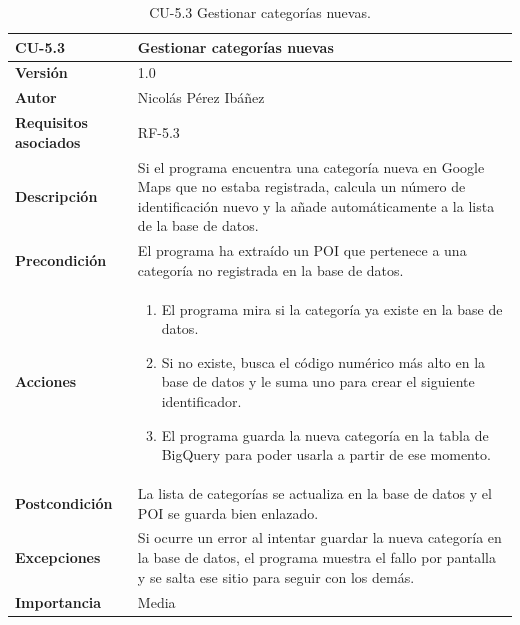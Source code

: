\begin{table}[p]
	\centering
	\begin{tabularx}{\linewidth}{ p{} p{} }
		\toprule
		\textbf{CU-5.3}  & \textbf{Gestionar categorías nuevas}\\
		\toprule
		\textbf{Versión}              & 1.0    \\
		\textbf{Autor}                & Nicolás Pérez Ibáñez \\
		\textbf{Requisitos asociados} & RF-5.3 \\
		\textbf{Descripción}          & Si el programa encuentra una categoría nueva en Google Maps que no estaba registrada, calcula un número de identificación nuevo y la añade automáticamente a la lista de la base de datos. \\
		\textbf{Precondición}         & El programa ha extraído un POI que pertenece a una categoría no registrada en la base de datos. \\
		\textbf{Acciones}             &
		\begin{enumerate}
			\def\labelenumi{\arabic{enumi}.}
			\tightlist
			\item El programa mira si la categoría ya existe en la base de datos.
			\item Si no existe, busca el código numérico más alto en la base de datos y le suma uno para crear el siguiente identificador.
			\item El programa guarda la nueva categoría en la tabla de BigQuery para poder usarla a partir de ese momento.
		\end{enumerate}\\
		\textbf{Postcondición}        & La lista de categorías se actualiza en la base de datos y el POI se guarda bien enlazado. \\
		\textbf{Excepciones}          & Si ocurre un error al intentar guardar la nueva categoría en la base de datos, el programa muestra el fallo por pantalla y se salta ese sitio para seguir con los demás. \\
		\textbf{Importancia}          & Media \\
		\bottomrule
	\end{tabularx}
	\caption{CU-5.3 Gestionar categorías nuevas.}
\end{table}

